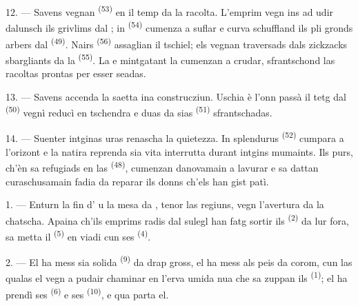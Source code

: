 \VUsaut{5.0mm}
\VUsaut{3.4mm}

12. --- Savens vegnan  \textsuperscript{(53)} en il temp da la racolta.
L'emprim vegn ins ad udir dalunsch ils grivlims dal ; in  \textsuperscript{(54)} cumenza a suflar e curva schuffland ils pli gronds arbers
dal  \textsuperscript{(49)}. Nairs  \textsuperscript{(56)}
assaglian il tschiel; els vegnan traversads dals zickzacks sbargliants da la
 \textsuperscript{(55)}. La  e mintgatant la
 cumenzan a crudar, sfrantschond las racoltas prontas per esser
seadas.

13. --- Savens accenda la saetta ina construcziun. Uschia è l'onn passà il tetg dal
 \textsuperscript{(50)} vegnì reducì en tschendra e duas da sias
 \textsuperscript{(51)} sfrantschadas.

14. --- Suenter intginas uras renascha la quietezza. In splendurus  \textsuperscript{(52)} cumpara a l'orizont e la natira reprenda sia vita
interrutta durant intgins mumaints. Ils purs, ch'èn sa refugiads en las
 \textsuperscript{(48)}, cumenzan danovamain a lavurar e sa dattan
curaschusamain fadia da reparar ils donns ch'els han gist patì.

\VUsaut{6.0mm}
\VUsaut{3.6mm}

\VUsaut{1.4mm}
\VUsaut{4.0mm}

1. --- Enturn la fin d' u la mesa da , tenor las
regiuns, vegn l'avertura da la chatscha. Apaina ch'ils emprims radis dal sulegl han
fatg sortir ils  \textsuperscript{(2)} da lur fora, sa metta il
 \textsuperscript{(5)} en viadi cun ses 
\textsuperscript{(4)}.

2. --- El ha mess sia solida  \textsuperscript{(9)} da
drap gross, el ha mess als peis  da corom, cun las qualas el vegn a
pudair chaminar en l'erva umida nua che sa zuppan ils 
\textsuperscript{(1)}; el ha prendì ses  \textsuperscript{(6)} e ses
 \textsuperscript{(10)}, e qua parta el.

